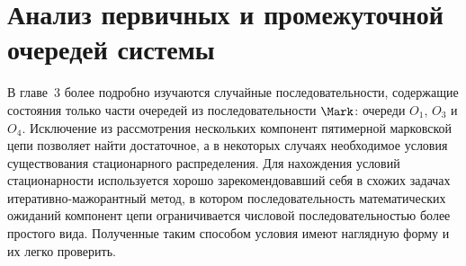 \chapter{Анализ первичных и промежуточной очередей системы}	

В главе~3 более подробно изучаются случайные последовательности,  содержащие состояния только части очередей из последовательности $\Mark$: очереди $O_1$,  $O_3$ и $O_4$. Исключение из рассмотрения нескольких компонент пятимерной марковской цепи позволяет найти достаточное,  а в некоторых случаях  необходимое условия существования стационарного распределения. Для нахождения условий стационарности используется хорошо зарекомендовавший себя в схожих задачах итеративно-мажорантный метод,  в котором последовательность математических ожиданий компонент цепи ограничивается числовой последовательностью более простого вида.
Полученные таким способом условия имеют наглядную форму и их легко проверить.

